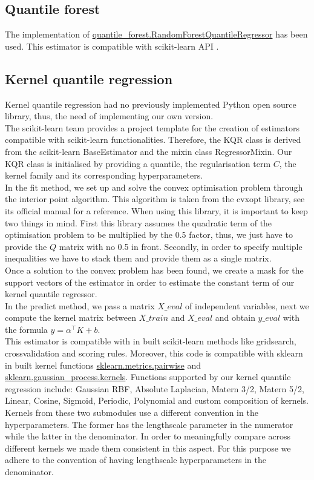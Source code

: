 \subsection{Quantile forest}
The implementation of \href{https://pypi.org/project/quantile-forest/}{quantile\_forest.RandomForestQuantileRegressor} has been used. This estimator is compatible with scikit-learn API \cite{Johnson2024}.
\subsection{Kernel quantile regression}
Kernel quantile regression had no previously implemented Python open source library, thus, the need of implementing our own version.
\\
The scikit-learn team provides a project template for the creation of estimators compatible with scikit-learn functionalities. Therefore, the KQR class is derived from the scikit-learn BaseEstimator and the mixin class RegressorMixin.
Our KQR class is initialised by providing a quantile, the regularisation term $C$, the kernel family and its corresponding hyperparameters.
\\
In the fit method, we set up and solve the convex optimisation problem through the interior point algorithm. This algorithm is taken from the cvxopt library, see its official manual  for a reference.
When using this library, it is important to keep two things in mind. First this library assumes the quadratic term of the optimisation problem to be multiplied by the 0.5 factor, thus, we just have to provide the $Q$ matrix with no 0.5 in front.
Secondly, in order to specify multiple inequalities we have to stack them and provide them as a single matrix.
\\
Once a solution to the convex problem has been found, we create a mask for the support vectors of the estimator in order to estimate the constant term of our kernel quantile regressor.
\\
In the predict method, we pass a matrix $X\_eval$ of independent variables, next we compute the kernel matrix between $X\_train$ and $X\_eval$ and obtain $y\_eval$ with the formula $y=\alpha^\intercal K+b$.
\\
This estimator is compatible with in built scikit-learn methods like gridsearch, crossvalidation and scoring rules. Moreover, this code is compatible with sklearn in built kernel functions \href{https://scikit-learn.org/stable/api/sklearn.metrics.html}{sklearn.metrics.pairwise} and \href{https://scikit-learn.org/stable/api/sklearn.gaussian_process.html}{sklearn.gaussian\_process.kernels}. Functions supported by our kernel quantile regression include: Gaussian RBF, Absolute Laplacian, Matern 3/2, Matern 5/2, Linear, Cosine, Sigmoid, Periodic, Polynomial and custom composition of kernels. 
Kernels from these two submodules use a different convention in the hyperparameters. The former has the lengthscale parameter in the numerator while the latter in the denominator. In order to meaningfully compare across different kernels we made them consistent in this aspect. For this purpose we adhere to the convention of having lengthscale hyperparameters in the denominator.

